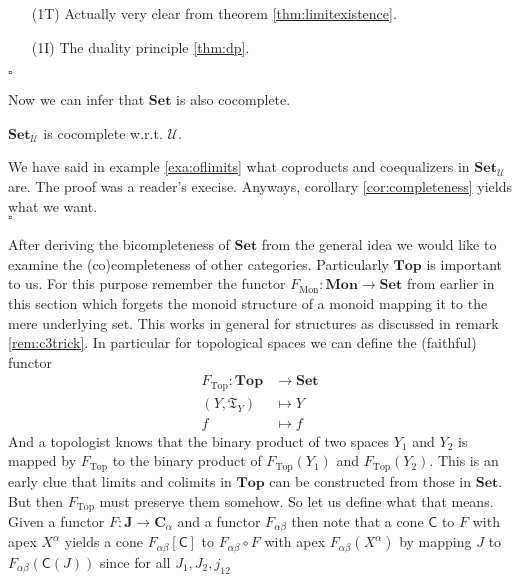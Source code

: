 \begin{prf}
\begin{enumerate}
\item[(1T)]
Actually very clear from theorem \ref{thm:limitexistence}.
\item[(1I)]
The duality principle \ref{thm:dp}.
\end{enumerate}
\phantom{proven}
\hfill
$\square$
\end{prf}
Now we can infer that $\mathbf{Set}$ is also cocomplete.
\\
\begin{thm}
\label{thm:setcocomplete}
$\mathbf{Set}_{\mathcal{U}}$ is cocomplete w.r.t. $\mathcal{U}$.
\end{thm}
\begin{prf}
We have said in example \ref{exa:oflimits} what coproducts and coequalizers in $\mathbf{Set}_{\mathcal{U}}$ are. The proof was a reader's execise. Anyways, corollary \ref{cor:completeness} yields what we want.
\\
\phantom{proven}
\hfill
$\square$
\end{prf}
After deriving the bicompleteness of $\mathbf{Set}$ from the general idea we would like to examine the (co)completeness of other categories. Particularly $\mathbf{Top}$ is important to us. For this purpose remember the functor $F_{\mathrm{Mon}} \colon \mathbf{Mon} \rightarrow \mathbf{Set}$ from earlier in this section which forgets the monoid structure of a monoid mapping it to the mere underlying set. This works in general for {\glqq}structures{\grqq} as discussed in remark \ref{rem:c3trick}. In particular for topological spaces we can define the (faithful) functor
\begin{align*}
  F_{\mathrm{Top}}
  \colon
  \mathbf{Top}
  &\rightarrow
  \mathbf{Set}
  \\
  (Y,\mathfrak{T}_{Y})
  &\mapsto
  Y
  \\
  f
  &\mapsto
  f
\end{align*}
And a topologist knows that the binary product of two spaces $Y_{1}$ and $Y_{2}$ is mapped by $F_{\mathrm{Top}}$ to the binary product of $F_{\mathrm{Top}}(Y_{1})$ and $F_{\mathrm{Top}}(Y_{2})$. This is an early clue that limits and colimits in $\mathbf{Top}$ can be constructed from those in $\mathbf{Set}$. But then $F_{\mathrm{Top}}$ must preserve them somehow. So let us define what that means. Given a functor $F \colon \mathbf{J} \rightarrow \mathbf{C}_{\alpha}$ and a functor $F_{\alpha\beta}$ then note that a cone $\mathsf{C}$ to $F$ with apex $X^{\alpha}$ yields a cone $F_{\alpha\beta}[\mathsf{C}]$ to $F_{\alpha\beta} \circ F$ with apex $F_{\alpha\beta}(X^{\alpha})$ by mapping $J$ to $F_{\alpha\beta}(\mathsf{C}(J))$ since for all $J_{1},J_{2},j_{12}$
